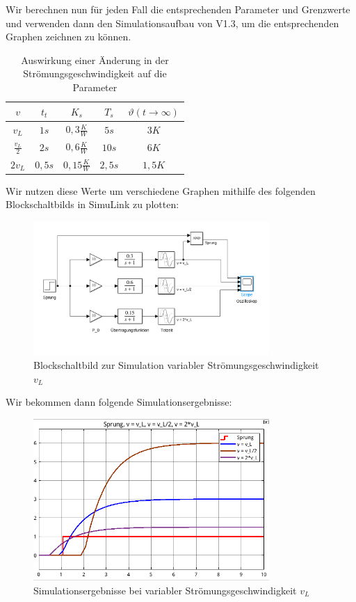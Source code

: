 \documentclass{report}
\begin{document}
Wir berechnen nun für jeden Fall die entsprechenden Parameter und Grenzwerte und verwenden dann den Simulationsaufbau von V1.3, um die entsprechenden Graphen zeichnen zu können.

\begin{table}[h]
  \centering
  \begin{tabular}{|c||c|c|c|c|}
    \hline
    $v$ & $t_{t}$ & $K_{s}$ & $T_{s}$  & $\vartheta(t\to\infty)$\\
    \hline
    $v_{L}$ & $1s$ & $0,3\frac{K}{W}$ & $5s$ & $3K$ \\
    \hline
    $\frac{v_{L}}{2}$ & $2s$ & $0,6\frac{K}{W}$ & $10s$ & $6K$ \\
    \hline
    $2v_{L}$ & $0,5s$ & $0,15\frac{K}{W}$ & $2,5s$ & $1,5K$\\
    \hline
  \end{tabular}
  \caption{Auswirkung einer Änderung in der Strömungsgeschwindigkeit auf die Parameter}
  \label{tab:speed}
\end{table}
\newpage
Wir nutzen diese Werte um verschiedene Graphen mithilfe des folgenden Blockschaltbilds in SimuLink zu plotten:

\begin{figure}[h]
  \centering
  \includegraphics[width=0.8\textwidth]{../assets/images/RTP/rtp_1_V15.png}
  \caption{Blockschaltbild zur Simulation variabler Strömungsgeschwindigkeit $v_L$}
  \label{fig:vl}
\end{figure}
Wir bekommen dann folgende Simulationsergebnisse:

\begin{figure}[h]
  \centering
  \includegraphics[width=0.8\textwidth]{../assets/images/RTP/rtp_1_V15_2.png}
  \caption{Simulationsergebnisse bei variabler Strömungsgeschwindigkeit $v_{L}$}
  \label{fig:vlplot}
\end{figure}
\end{document}
